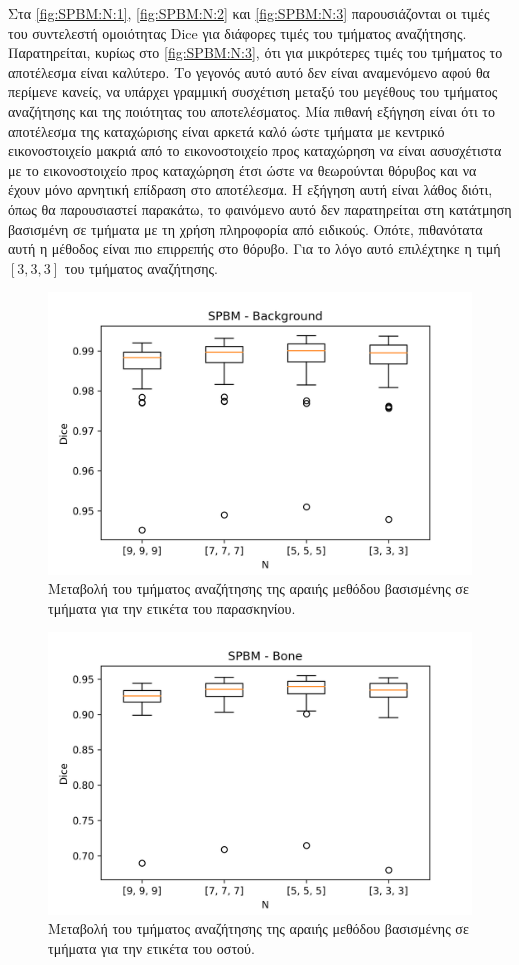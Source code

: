 \documentclass[a4paper,12pt]{article}
\begin{document}
Στα \autoref{fig:SPBM:N:1}, \autoref{fig:SPBM:N:2} και \autoref{fig:SPBM:N:3}
παρουσιάζονται οι τιμές του συντελεστή ομοιότητας Dice για διάφορες τιμές του
τμήματος αναζήτησης. Παρατηρείται, κυρίως στο \autoref{fig:SPBM:N:3}, ότι για
μικρότερες τιμές του τμήματος το αποτέλεσμα είναι καλύτερο. Το γεγονός αυτό αυτό
δεν είναι αναμενόμενο αφού θα περίμενε κανείς, να υπάρχει γραμμική συσχέτιση
μεταξύ του μεγέθους του τμήματος αναζήτησης και της ποιότητας του αποτελέσματος.
Μία πιθανή εξήγηση είναι ότι το αποτέλεσμα της καταχώρισης είναι αρκετά καλό
ώστε τμήματα με κεντρικό εικονοστοιχείο μακριά από το εικονοστοιχείο προς
καταχώρηση να είναι ασυσχέτιστα με το εικονοστοιχείο προς καταχώρηση έτσι ώστε
να θεωρούνται θόρυβος και να έχουν μόνο αρνητική επίδραση στο αποτέλεσμα. Η
εξήγηση αυτή είναι λάθος διότι, όπως θα παρουσιαστεί παρακάτω, το φαινόμενο
αυτό δεν παρατηρείται στη κατάτμηση βασισμένη σε τμήματα με τη χρήση πληροφορία
από ειδικούς. Οπότε, πιθανότατα αυτή η μέθοδος είναι πιο επιρρεπής στο θόρυβο.
Για το λόγο αυτό επιλέχτηκε η τιμή $[3,3,3]$ του τμήματος αναζήτησης.


\begin{figure}[H]
    \centering
    \includegraphics[width=0.85\linewidth]{SPBM_N_Background_plot.png}
    \caption{Μεταβολή του τμήματος αναζήτησης της αραιής μεθόδου βασισμένης σε
             τμήματα για την ετικέτα του παρασκηνίου.}
    \label{fig:SPBM:N:1}
\end{figure}

\begin{figure}[H]
    \centering
    \includegraphics[width=0.85\linewidth]{SPBM_N_Bone_plot.png}
    \caption{Μεταβολή του τμήματος αναζήτησης της αραιής μεθόδου βασισμένης σε
             τμήματα για την ετικέτα του οστού.}
    \label{fig:SPBM:N:2}
\end{figure}
\end{document}
